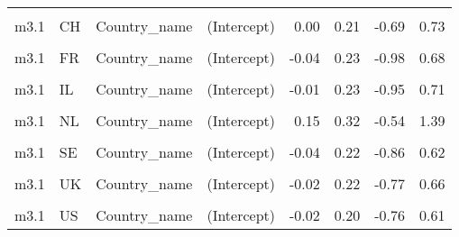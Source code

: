 \begin{table}
\begin{tabular}[t]{llllrrrr}
\cellcolor{gray!10}{m3.1} & \cellcolor{gray!10}{CA} & \cellcolor{gray!10}{Country\_name} & \cellcolor{gray!10}{EPS} & \cellcolor{gray!10}{-0.16} & \cellcolor{gray!10}{0.13} & \cellcolor{gray!10}{-0.44} & \cellcolor{gray!10}{0.13}\\
m3.1 & CH & Country\_name & (Intercept) & 0.00 & 0.21 & -0.69 & 0.73\\
\cellcolor{gray!10}{m3.1} & \cellcolor{gray!10}{CH} & \cellcolor{gray!10}{Country\_name} & \cellcolor{gray!10}{EPS} & \cellcolor{gray!10}{0.00} & \cellcolor{gray!10}{0.11} & \cellcolor{gray!10}{-0.25} & \cellcolor{gray!10}{0.25}\\
m3.1 & FR & Country\_name & (Intercept) & -0.04 & 0.23 & -0.98 & 0.68\\
\cellcolor{gray!10}{m3.1} & \cellcolor{gray!10}{FR} & \cellcolor{gray!10}{Country\_name} & \cellcolor{gray!10}{EPS} & \cellcolor{gray!10}{-0.14} & \cellcolor{gray!10}{0.12} & \cellcolor{gray!10}{-0.40} & \cellcolor{gray!10}{0.14}\\
m3.1 & IL & Country\_name & (Intercept) & -0.01 & 0.23 & -0.95 & 0.71\\
\cellcolor{gray!10}{m3.1} & \cellcolor{gray!10}{IL} & \cellcolor{gray!10}{Country\_name} & \cellcolor{gray!10}{EPS} & \cellcolor{gray!10}{-0.01} & \cellcolor{gray!10}{0.19} & \cellcolor{gray!10}{-0.51} & \cellcolor{gray!10}{0.50}\\
m3.1 & NL & Country\_name & (Intercept) & 0.15 & 0.32 & -0.54 & 1.39\\
\cellcolor{gray!10}{m3.1} & \cellcolor{gray!10}{NL} & \cellcolor{gray!10}{Country\_name} & \cellcolor{gray!10}{EPS} & \cellcolor{gray!10}{0.32} & \cellcolor{gray!10}{0.14} & \cellcolor{gray!10}{-0.02} & \cellcolor{gray!10}{0.63}\\
m3.1 & SE & Country\_name & (Intercept) & -0.04 & 0.22 & -0.86 & 0.62\\
\cellcolor{gray!10}{m3.1} & \cellcolor{gray!10}{SE} & \cellcolor{gray!10}{Country\_name} & \cellcolor{gray!10}{EPS} & \cellcolor{gray!10}{-0.09} & \cellcolor{gray!10}{0.12} & \cellcolor{gray!10}{-0.37} & \cellcolor{gray!10}{0.18}\\
m3.1 & UK & Country\_name & (Intercept) & -0.02 & 0.22 & -0.77 & 0.66\\
\cellcolor{gray!10}{m3.1} & \cellcolor{gray!10}{UK} & \cellcolor{gray!10}{Country\_name} & \cellcolor{gray!10}{EPS} & \cellcolor{gray!10}{-0.04} & \cellcolor{gray!10}{0.11} & \cellcolor{gray!10}{-0.30} & \cellcolor{gray!10}{0.24}\\
m3.1 & US & Country\_name & (Intercept) & -0.02 & 0.20 & -0.76 & 0.61\\

\end{tabular}
\end{table}
